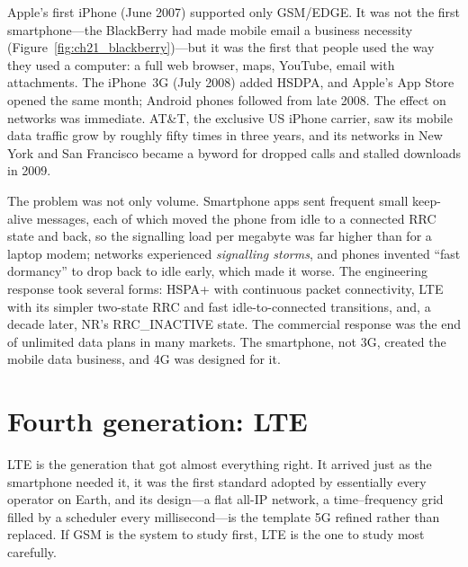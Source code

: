 \begin{history}
Apple's first iPhone (June 2007) supported only GSM/EDGE. It was not the first smartphone---the
BlackBerry had made mobile email a business necessity (Figure~\ref{fig:ch21_blackberry})---but it was
the first that people used the way they used a computer: a full web browser, maps, YouTube, email
with attachments. The iPhone~3G (July 2008) added HSDPA, and Apple's App Store opened the same month;
Android phones followed from late 2008. The effect on networks was immediate. AT\&T, the exclusive US
iPhone carrier, saw its mobile data traffic grow by roughly fifty times in three years, and its
networks in New York and San Francisco became a byword for dropped calls and stalled downloads in
2009.

The problem was not only volume. Smartphone apps sent frequent small keep-alive messages, each of
which moved the phone from idle to a connected RRC state and back, so the signalling load per
megabyte was far higher than for a laptop modem; networks experienced \emph{signalling storms}, and
phones invented ``fast dormancy'' to drop back to idle early, which made it worse. The engineering
response took several forms: HSPA+ with continuous packet connectivity, LTE with its simpler
two-state RRC and fast idle-to-connected transitions, and, a decade later, NR's RRC\_INACTIVE state.
The commercial response was the end of unlimited data plans in many markets. The smartphone, not 3G,
created the mobile data business, and 4G was designed for it.
\end{history}

\section{Fourth generation: LTE}
\label{sec:ch21:lte}

LTE is the generation that got almost everything right. It arrived just as the smartphone
needed it, it was the first standard adopted by essentially every operator on Earth, and its
design---a flat all-IP network, a time--frequency grid filled by a scheduler every millisecond---is
the template 5G refined rather than replaced. If GSM is the system to study first, LTE is the one to
study most carefully.

